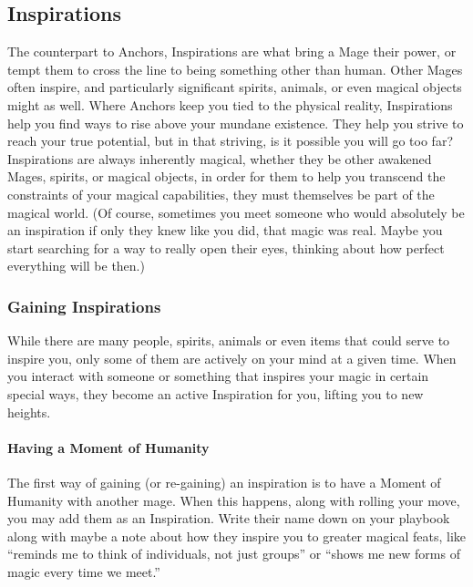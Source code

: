 \documentclass[
]{article}
\begin{document}
\hypertarget{inspirations}{%
\subsection{Inspirations}\label{inspirations}}

The counterpart to Anchors, Inspirations are what bring a Mage their
power, or tempt them to cross the line to being something other than
human. Other Mages often inspire, and particularly significant spirits,
animals, or even magical objects might as well. Where Anchors keep you
tied to the physical reality, Inspirations help you find ways to rise
above your mundane existence. They help you strive to reach your true
potential, but in that striving, is it possible you will go too far?
Inspirations are always inherently magical, whether they be other
awakened Mages, spirits, or magical objects, in order for them to help
you transcend the constraints of your magical capabilities, they must
themselves be part of the magical world. (Of course, sometimes you meet
someone who would absolutely be an inspiration if only they knew like
you did, that magic was real. Maybe you start searching for a way to
really open their eyes, thinking about how perfect everything will be
then.)

\hypertarget{gaining-inspirations}{%
\subsubsection{Gaining Inspirations}\label{gaining-inspirations}}

While there are many people, spirits, animals or even items that could
serve to inspire you, only some of them are actively on your mind at a
given time. When you interact with someone or something that inspires
your magic in certain special ways, they become an active Inspiration
for you, lifting you to new heights.

\hypertarget{having-a-moment-of-humanity}{%
\paragraph{Having a Moment of
Humanity}\label{having-a-moment-of-humanity}}

The first way of gaining (or re-gaining) an inspiration is to have a
Moment of Humanity with another mage. When this happens, along with
rolling your move, you may add them as an Inspiration. Write their name
down on your playbook along with maybe a note about how they inspire you
to greater magical feats, like ``reminds me to think of individuals, not
just groups'' or ``shows me new forms of magic every time we meet.''
\end{document}
